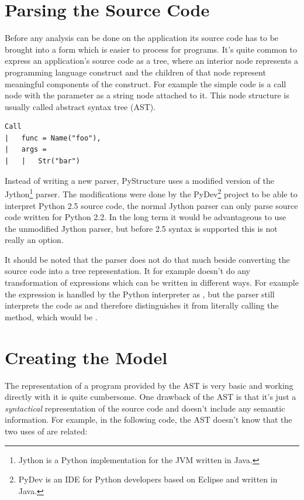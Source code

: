 \documentclass[12pt,halfparskip,DIV11,BCOR10mm]{scrreprt}
\begin{document}
\section{Parsing the Source Code}

Before any analysis can be done on the application its source code has to be brought into a form which is easier to process for programs. It's quite common to express an application's source code as a tree, where an interior node represents a programming language construct and the children of that node represent meaningful components of the construct. For example the simple code  is a call node with the parameter as a string node attached to it. This node structure is usually called abstract syntax tree (AST).

\begin{lstlisting}
Call
|   func = Name("foo"),
|   args = 
|   |   Str("bar")
\end{lstlisting}

Instead of writing a new parser, PyStructure uses a modified version of the Jython\footnote{Jython is a Python implementation for the JVM written in Java.} parser. The modifications were done by the PyDev\footnote{PyDev is an IDE for Python developers based on Eclipse and written in Java.} project to be able to interpret Python 2.5 source code, the normal Jython parser can only parse source code written for Python 2.2. In the long term it would be advantageous to use the unmodified Jython parser, but before 2.5 syntax is supported this is not really an option.

It should be noted that the parser does not do that much beside converting the source code into a tree representation. It for example doesn't do any transformation of expressions which can be written in different ways. For example the expression  is handled by the Python interpreter as , but the parser still interprets the code as  and therefore distinguishes it from literally calling the  method, which would be . 


\section{Creating the Model}


The representation of a program provided by the AST is very basic and working directly with it is quite cumbersome. 
One drawback of the AST is that it's just a \emph{syntactical} representation of the source code and doesn't include any semantic information. For example, in the following code, the AST doesn't know that the two uses of  are related:
\end{document}
